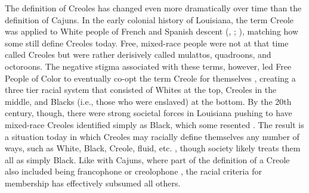 \documentclass{article}\usepackage[]{graphicx}\usepackage[]{xcolor}
\newcommand{\lexi}[1]{\textit{#1}}
\begin{document}


      The definition of Creoles has changed even more dramatically over time than the definition of Cajuns.
      In the early colonial history of Louisiana, the term Creole was applied to White people of French and Spanish descent (\citeauthor{fortier_french_1884}, \citeyear[p.~98]{fortier_french_1884}; \citeauthor[Kein, 2000, as cited in][]{susberry_racial_2004} \citeyear[pp.~7-8]{susberry_racial_2004}), matching how some still define Creoles today.
      Free, mixed-race people were not at that time called Creoles but were rather derisively called mulattos, quadroons, and octoroons.
      The negative stigma associated with these terms, however, led Free People of Color to eventually co-opt the term Creole for themselves \parencite[Martin, 2000, as cited in][pp.~7-8]{susberry_racial_2004}, creating a three tier racial system that consisted of Whites at the top, Creoles in the middle, and Blacks (i.e., those who were enslaved) at the bottom.
      By the 20th century, though, there were strong societal forces in Louisiana pushing to have mixed-race Creoles identified simply as Black, which some resented \parencite[pp.~12-13]{susberry_racial_2004}.
      The result is a situation today in which Creoles may racially define themselves any number of ways, such as White, Black, Creole, fluid, etc. \parencite{susberry_racial_2004}, though society likely treats them all as simply Black.
      Like with Cajuns, where part of the definition of a Creole also included being francophone or creolophone \parencite[p.~11]{neumann_creole_1985}, the racial criteria for membership has effectively subsumed all others.
\end{document}

